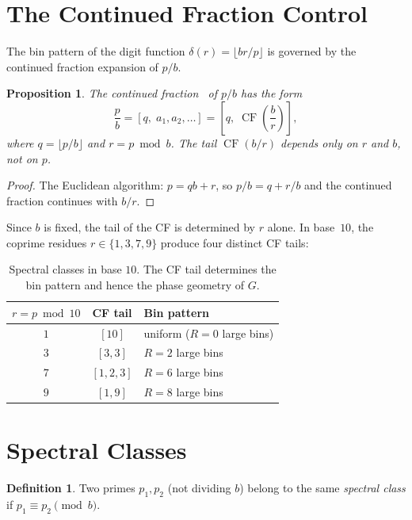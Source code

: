 \documentclass[12pt]{amsart}
\newtheorem{proposition}[theorem]{Proposition}
\theoremstyle{definition}
\newtheorem{definition}[theorem]{Definition}
\theoremstyle{remark}
\begin{document}
\section{The Continued Fraction Control}

The bin pattern of the digit function $\delta(r) = \lfloor br/p
\rfloor$ is governed by the continued fraction expansion of $p/b$.

\begin{proposition}\label{prop:cf-structure}
The continued fraction~\cite{khinchin} of $p/b$ has the form
\[
\frac{p}{b} = [q,\; a_1, a_2, \ldots]
= \left[q,\; \operatorname{CF}\!\left(\frac{b}{r}\right)\right],
\]
where $q = \lfloor p/b \rfloor$ and $r = p \bmod b$. The tail
$\operatorname{CF}(b/r)$ depends only on $r$ and $b$, not on $p$.
\end{proposition}

\begin{proof}
The Euclidean algorithm: $p = qb + r$, so $p/b = q + r/b$ and the
continued fraction continues with $b/r$.
\end{proof}

Since $b$ is fixed, the tail of the CF is determined by $r$ alone.
In base~$10$, the coprime residues $r \in \{1, 3, 7, 9\}$ produce
four distinct CF tails:

\begin{table}[h]
\centering
\begin{tabular}{ccl}
\toprule
$r = p \bmod 10$ & CF tail & Bin pattern \\
\midrule
$1$ & $[10]$       & uniform ($R = 0$ large bins) \\
$3$ & $[3, 3]$     & $R = 2$ large bins \\
$7$ & $[1, 2, 3]$  & $R = 6$ large bins \\
$9$ & $[1, 9]$     & $R = 8$ large bins \\
\bottomrule
\end{tabular}
\caption{Spectral classes in base $10$. The CF tail determines the
bin pattern and hence the phase geometry of $G$.}
\end{table}

\section{Spectral Classes}

\begin{definition}
Two primes $p_1, p_2$ (not dividing $b$) belong to the same
\emph{spectral class} if $p_1 \equiv p_2 \pmod{b}$.
\end{definition}
\end{document}
